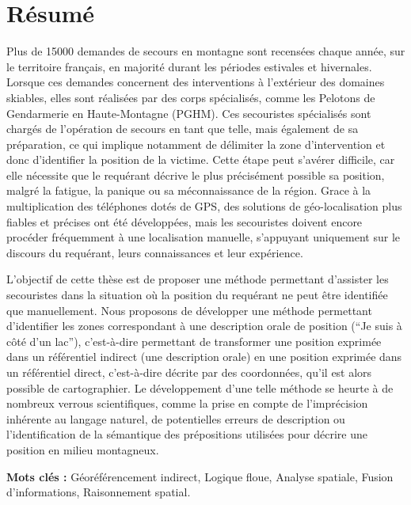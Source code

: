 \section*{Résumé}

Plus de \num{15000} demandes de secours en montagne sont recensées
chaque année, sur le territoire français, en majorité durant les
périodes estivales et hivernales. Lorsque ces demandes concernent des
interventions à l'extérieur des domaines skiables, elles sont
réalisées par des corps spécialisés, comme les Pelotons de Gendarmerie
en Haute-Montagne (PGHM). Ces secouristes spécialisés sont chargés de
l'opération de secours en tant que telle, mais également de sa
préparation, ce qui implique notamment de délimiter la zone
d'intervention et donc d'identifier la position de la victime. Cette
étape peut s'avérer difficile, car elle nécessite que le requérant
décrive le plus précisément possible sa position, malgré la fatigue,
la panique ou sa méconnaissance de la région. Grace à la
multiplication des téléphones dotés de GPS, des solutions de
géo-localisation plus fiables et précises ont été développées, mais
les secouristes doivent encore procéder fréquemment à une localisation
manuelle, s'appuyant uniquement sur le discours du requérant, leurs
connaissances et leur expérience.

L'objectif de cette thèse est de proposer une méthode permettant
d'assister les secouristes dans la situation où la position du
requérant ne peut être identifiée que manuellement. Nous proposons de
développer une méthode permettant d'identifier les zones correspondant
à une description orale de position (\eg \enquote{Je suis à côté d'un
  lac}), c'est-à-dire permettant de transformer une position exprimée
dans un référentiel indirect (une description orale) en une position
exprimée dans un référentiel direct, c'est-à-dire décrite par des
coordonnées, qu'il est alors possible de cartographier. Le
développement d'une telle méthode se heurte à de nombreux verrous
scientifiques, comme la prise en compte de l'imprécision inhérente au
langage naturel, de potentielles erreurs de description ou
l’identification de la sémantique des prépositions utilisées pour
décrire une position en milieu montagneux.

\vspace{.5cm}

\noindent\textbf{Mots clés :} Géoréférencement indirect, Logique
floue, Analyse spatiale, Fusion d'informations, Raisonnement spatial.\par

